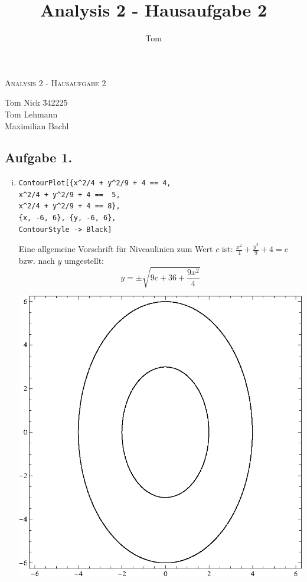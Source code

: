 \documentclass[10pt,a4paper]{scrartcl}
\author{Tom}
\title{Analysis 2 - Hausaufgabe 2}
\begin{document}
\begin{center}
\textsc{\Large{Analysis 2 - Hausaufgabe 2}} \\
\end{center}
\begin{tabbing}
Tom Nick \hspace{1.4cm}\= 342225\\
Tom Lehmann\\
Maximilian Bachl
\end{tabbing}
\subsection*{Aufgabe 1.}
\begin{enumerate}[(i)]
\item
\begin{minipage}{0.49\columnwidth}
\begin{lstlisting}[caption= Mathematica Code für die Niveaulinien von h]
ContourPlot[{x^2/4 + y^2/9 + 4 == 4, 
x^2/4 + y^2/9 + 4 ==  5, 
x^2/4 + y^2/9 + 4 == 8}, 
{x, -6, 6}, {y, -6, 6},
ContourStyle -> Black]
\end{lstlisting}
Eine allgemeine Vorschrift für Niveaulinien zum Wert $c$ ist: $\frac{x^2}{4} + \frac{y^2}{9} + 4 =c$ bzw. nach $y$ umgestellt: $$y = \pm\sqrt{9c + 36 + \frac{9x^2}{4}}$$
\end{minipage}
\begin{minipage}{0.49\columnwidth}
\begin{center}
\includegraphics[scale=0.7]{1i.eps} 

\end{center}
\end{minipage}
\end{enumerate}
\end{document}

